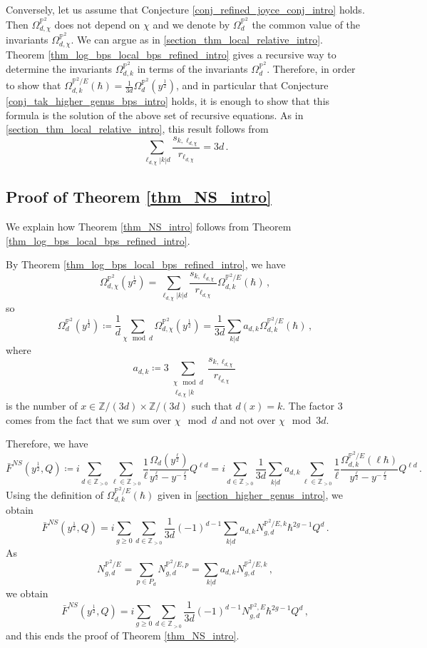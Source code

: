 \documentclass[11pt,letterpaper]{amsart}
\newcommand\PP{\mathbb P}
\newcommand\Z{\mathbb Z}
\begin{document}
Conversely, let us assume that Conjecture 
\ref{conj_refined_joyce_conj_intro} holds. Then $\Omega_{d,\chi}^{\PP^2}$ does not depend on $\chi$ and we denote by 
$\Omega_d^{\PP^2}$ the common value of the invariants $\Omega_{d,\chi}^{\PP^2}$.
We can argue as in \cref{section_thm_local_relative_intro}.
Theorem \ref{thm_log_bps_local_bps_refined_intro} gives a recursive way to determine the invariants $\Omega_{d,k}^{\PP^2}$ in terms of the invariants $\Omega_d^{\PP^2}$. 
Therefore, in order to show that 
$\Omega_{d,k}^{\PP^2/E}(\hbar)=
\frac{1}{3d}
\Omega_d^{\PP^2}(y^{\frac{1}{2}})$, and in particular that Conjecture \ref{conj_tak_higher_genus_bps_intro} holds, it is enough to show that this formula is the solution of the above set of recursive equations. As in \cref{section_thm_local_relative_intro}, this result follows from 
\[ \sum_{\ell_{d,\chi}|k|d}
\frac{s_{k,\ell_{d,\chi}}}{r_{\ell_{d,\chi}}}=3d\,.\]


\subsection{Proof of Theorem \ref{thm_NS_intro}}
\label{section_proof_thm_NS_intro}


We explain how Theorem \ref{thm_NS_intro}
follows from Theorem \ref{thm_log_bps_local_bps_refined_intro}.

By Theorem \ref{thm_log_bps_local_bps_refined_intro}, we have
\[ 
\Omega_{d,\chi}^{\PP^2}(y^{\frac{1}{2}})=\sum_{\ell_{d,\chi}|k|d}
\frac{s_{k,\ell_{d,\chi}}}{r_{\ell_{d,\chi}}} \Omega_{d,k}^{\PP^2/E}(\hbar)\,,\]
so 
\[ \Omega_d^{\PP^2}(y^{\frac{1}{2}})
\coloneq \frac{1}{d} \sum_{\chi\mod d} \Omega_{d,\chi}^{\PP^2}(y^{\frac{1}{2}})
=\frac{1}{3d} \sum_{k|d} a_{d,k}
 \Omega_{d,k}^{\PP^2/E}(\hbar) \,,\]
where 
\[ a_{d,k} \coloneq 3
\sum_{\substack{ \chi \mod d \\
\ell_{d,\chi}|k}}
\frac{s_{k,\ell_{d,\chi}}}{r_{\ell_{d,\chi}}}\,\]
is the number of $x \in \Z/(3d)
\times \Z/(3d)$ such that $d(x)=k$.
The factor $3$ comes from the fact that we sum over $\chi \mod d$ and not over $\chi \mod 3d$.

Therefore, we have
\[ \bar{F}^{NS}(y^{\frac{1}{2}},Q) 
\coloneq i \sum_{d \in \Z_{>0}}
\sum_{\ell \in \Z_{>0}} \frac{1}{\ell} \frac{\Omega_{d}(y^{\frac{\ell}{2}})}{
y^{\frac{\ell}{2}}-y^{-\frac{\ell}{2}}} Q^{\ell d} 
=
i \sum_{d \in \Z_{>0}} \frac{1}{3d}
\sum_{k|d} a_{d,k} 
\sum_{\ell \in \Z_{>0}}
\frac{1}{\ell} \frac{
\Omega_{d,k}^{\PP^2/E}(\ell \hbar)}{
y^{\frac{\ell}{2}}-y^{-\frac{\ell}{2}}} Q^{\ell d} \,.\]
Using the definition of $\Omega_{d,k}^{\PP^2/E}(\hbar)$ given in \cref{section_higher_genus_intro}, we obtain
\[ \bar{F}^{NS}(y^{\frac{1}{2}},Q) 
= i \sum_{g \geqslant 0}
\sum_{d \in \Z_{>0}} \frac{1}{3d}
(-1)^{d-1} \sum_{k|d} a_{d,k} N_{g,d}^{\PP^2/E,k} \hbar^{2g-1} Q^{d}\,.\]
As 
\[ N_{g,d}^{\PP^2/E}=\sum_{p \in P_d}
N_{g,d}^{\PP^2/E,p} 
=\sum_{k|d} a_{d,k} N_{g,d}^{\PP^2/E,k}\,, \]
we obtain
\[ \bar{F}^{NS}(y^{\frac{1}{2}},Q) 
= i \sum_{g \geqslant 0}
\sum_{d \in \Z_{>0}} \frac{1}{3d}
(-1)^{d-1} N_{g,d}^{\PP^2,E}
\hbar^{2g-1} Q^{d}\,,\]
and this ends the proof of Theorem 
\ref{thm_NS_intro}.
\end{document}
